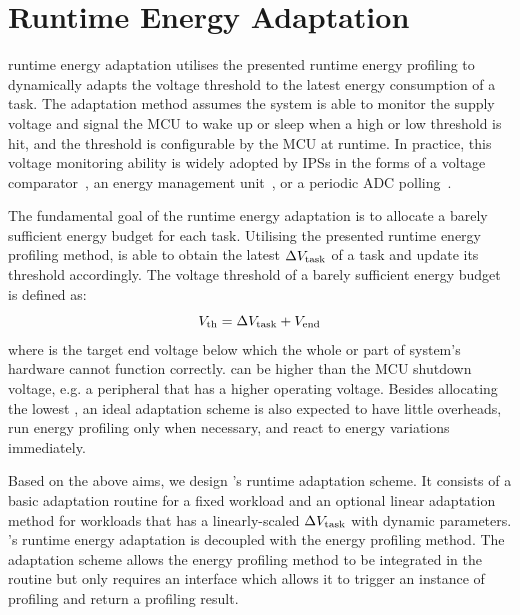 \section{\nn{} Runtime Energy Adaptation} \label{sec:method2}

\nn{} runtime energy adaptation utilises the presented runtime energy profiling to dynamically adapts the voltage threshold to the latest energy consumption of a task. 
The adaptation method assumes the system is able to monitor the supply voltage and signal the MCU to wake up or sleep when a high or low threshold is hit, and the threshold is configurable by the MCU at runtime. 
In practice, this voltage monitoring ability is widely adopted by IPSs in the forms of a voltage comparator~\cite{kang2018homerun, balsamo2016hibernus++}, an energy management unit~\cite{gomez2016dynamic, maeng2019supporting}, or a periodic ADC polling~\cite{sliper2019efficient}. 

The fundamental goal of the runtime energy adaptation is to allocate a barely sufficient energy budget for each task. 
Utilising the presented runtime energy profiling method, \nn{} is able to obtain the latest $\Delta V_{\text{task}}$ of a task and update its threshold accordingly. 
The voltage threshold  of a barely sufficient energy budget is defined as:
\begin{equation}
    V_{\text{th}} = \Delta V_{\text{task}} + V_{\text{end}}
    \label{eq:vth_definition}
\end{equation}
where  is the target end voltage below which the whole or part of system's hardware cannot function correctly. 
 can be higher than the MCU shutdown voltage, e.g. a peripheral that has a higher operating voltage. 
Besides allocating the lowest , an ideal adaptation scheme is also expected to have little overheads, run energy profiling only when necessary, and react to energy variations immediately.

Based on the above aims, we design \nn{}'s runtime adaptation scheme. 
It consists of a basic adaptation routine for a fixed workload and an optional linear adaptation method for workloads that has a linearly-scaled $\Delta V_{\text{task}}$ with dynamic parameters.
\nn{}'s runtime energy adaptation is decoupled with the energy profiling method. 
The adaptation scheme allows the energy profiling method to be integrated in the routine but only requires an interface which allows it to trigger an instance of profiling and return a profiling result.

